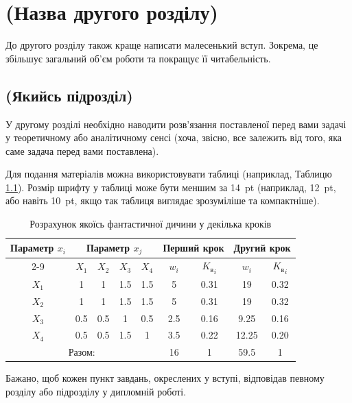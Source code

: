 \chapter{(Назва другого розділу)}
\label{chap:theory}

До другого розділу також краще написати малесенький вступ. Зокрема, це
збільшує загальний об'єм роботи та покращує її читабельність.

\section{(Якийсь підрозділ)}

У другому розділі необхідно наводити розв'язання поставленої перед вами
задачі у теоретичному або аналітичному сенсі (хоча, звісно, все залежить
від того, яка саме задача перед вами поставлена).

Для подання матеріалів можна використовувати таблиці (наприклад,
Таблицю \ref{tab_weight}). Розмір шрифту у таблиці може бути меншим за 14~pt (наприклад, 12~pt, або навіть 10~pt, якщо так таблиця виглядає зрозуміліше та компактніше).

    \begin{table}[ht]
    \setfontsize{14pt}
    \caption{Розрахунок якоїсь фантастичної дичини у декілька кроків}
    \label{tab_weight}
    \centering
        \begin{tabular}{|c|c|c|c|c|c|c|c|c|}
        \hline \multirow{2}{*}{Параметр $x_i$} & \multicolumn{4}{c|}{Параметр $x_j$} &
            \multicolumn{2}{c|}{Перший крок} & \multicolumn{2}{c|}{Другий крок} \\
        \cline{2-9} & $X_1$ & $X_2$ & $X_3$ & $X_4$ & $w_i$ &
            ${K_\text{в}}_i$ & $w_i$ & ${K_\text{в}}_i$ \\
        \hline $X_1$ & 1 & 1 & 1.5 & 1.5 & 5 & 0.31 & 19 & 0.32 \\
        \hline $X_2$ & 1 & 1 & 1.5 & 1.5 & 5 & 0.31 & 19 & 0.32 \\
        \hline $X_3$ & 0.5 & 0.5 & 1 & 0.5 & 2.5 & 0.16 & 9.25 & 0.16 \\
        \hline $X_4$ & 0.5 & 0.5 & 1.5 & 1 & 3.5 & 0.22 & 12.25 & 0.20 \\
        \hline \multicolumn{5}{|c|}{Разом:} & 16 & 1 & 59.5 & 1 \\
        \hline
        \end{tabular}
    \end{table}

Бажано, щоб кожен пункт завдань, окреслених у вступі, відповідав певному
розділу або підрозділу у дипломній роботі.

